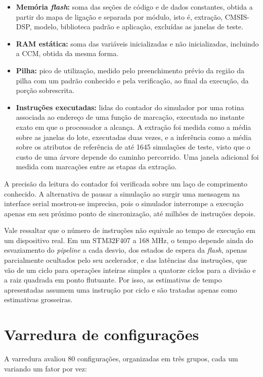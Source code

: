 \documentclass[
	12pt,				%
	openright,			%
	oneside,			%
	a4paper,			%
	english,			%
	brazil,				%
	]{abntex2}
\begin{document}
\begin{itemize}
    \item \textbf{Memória \textit{flash}:} soma das seções de código e de dados constantes, obtida a partir do mapa de ligação e separada por módulo, isto é, extração, CMSIS-DSP, modelo, biblioteca padrão e aplicação, excluídas as janelas de teste.

    \item \textbf{RAM estática:} soma das variáveis inicializadas e não inicializadas, incluindo a CCM, obtida da mesma forma.

    \item \textbf{Pilha:} pico de utilização, medido pelo preenchimento prévio da região da pilha com um padrão conhecido e pela verificação, ao final da execução, da porção sobrescrita.

    \item \textbf{Instruções executadas:} lidas do contador do simulador por uma rotina associada ao endereço de uma função de marcação, executada no instante exato em que o processador a alcança. A extração foi medida como a média sobre as janelas do lote, executadas duas vezes, e a inferência como a média sobre os atributos de referência de até 1645 simulações de teste, visto que o custo de uma árvore depende do caminho percorrido. Uma janela adicional foi medida com marcações entre as etapas da extração.
\end{itemize}

A precisão da leitura do contador foi verificada sobre um laço de comprimento conhecido. A alternativa de pausar a simulação ao surgir uma mensagem na interface serial mostrou-se imprecisa, pois o simulador interrompe a execução apenas em seu próximo ponto de sincronização, até milhões de instruções depois.

Vale ressaltar que o número de instruções não equivale ao tempo de execução em um dispositivo real. Em um STM32F407 a 168 MHz, o tempo depende ainda do esvaziamento do \textit{pipeline} a cada desvio, dos estados de espera da \textit{flash}, apenas parcialmente ocultados pelo seu acelerador, e das latências das instruções, que vão de um ciclo para operações inteiras simples a quatorze ciclos para a divisão e a raiz quadrada em ponto flutuante. Por isso, as estimativas de tempo apresentadas assumem uma instrução por ciclo e são tratadas apenas como estimativas grosseiras.

\section{Varredura de configurações}
A varredura avaliou 80 configurações, organizadas em três grupos, cada um variando um fator por vez:
\end{document}
